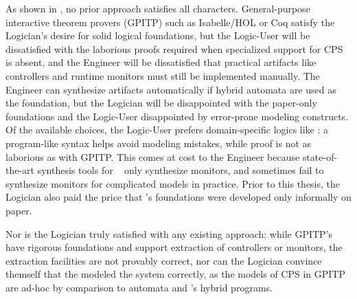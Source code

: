 \documentclass[12pt]{cmuthesis}
\theoremstyle{definition}
\theoremstyle{remark}
\newcommand{\rref}[2][]{\prettyref{#2}}
\newcommand{\Isabelle}{Isabelle/HOL\xspace}
\newcommand{\Coq}{Coq\xspace}
\begin{document}
As shown in \rref{tab:approach-comparison}, no prior approach satisfies all characters.
General-purpose interactive theorem provers (GPITP) such as \Isabelle or \Coq satisfy the Logician's desire for solid logical foundations,
but the Logic-User will be dissatisfied with the laborious proofs required when specialized support for CPS is absent, 
and the Engineer will be dissatisfied that practical artifacts like controllers and runtime monitors must still be implemented manually.
The Engineer can synthesize artifacts automatically if hybrid automata are used as the foundation, but the Logician will be disappointed with the paper-only foundations and the Logic-User disappointed by error-prone modeling constructs.
Of the available choices, the Logic-User prefers domain-specific logics like \dL: a program-like syntax helps avoid modeling mistakes, while proof is not as laborious as with GPITP.
This comes at cost to the Engineer because state-of-the-art synthesis tools for \dL~\cite{DBLP:journals/fmsd/MitschP16} only synthesize monitors, and sometimes fail to synthesize monitors for complicated models in practice.
Prior to this thesis, the Logician also paid the price that \dL's foundations were developed only informally on paper.

Nor is the Logician truly satisfied with any existing approach: while GPITP's have rigorous foundations and support extraction of controllers or monitors, the extraction facilities are not provably correct, nor can the Logician convince themself that the modeled the system correctly, as the models of CPS in GPITP are ad-hoc by comparison to automata and \dL's hybrid programs.
\end{document}

